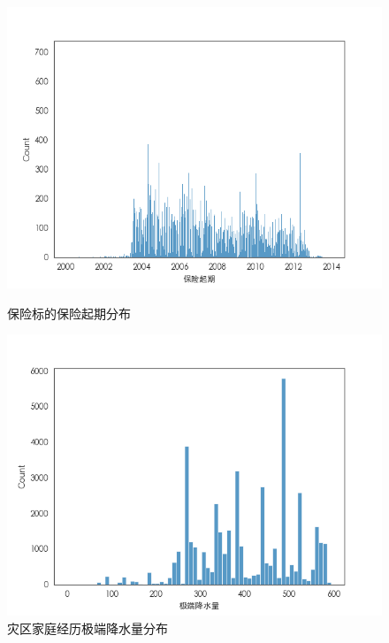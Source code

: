 \begin{figure}[H]
\begin{minipage}{0.48\linewidth}
        \includegraphics[width=\linewidth]{img/insurance.png}
        \caption{保险标的保险起期分布}\label{fig:insurance}
    \end{minipage}
    \begin{minipage}{0.48\linewidth}
        \includegraphics[width=\linewidth]{lib/img/precip.png}
        \caption{灾区家庭经历极端降水量分布}\label{fig:precip}
    \end{minipage}
\end{figure}
%     

